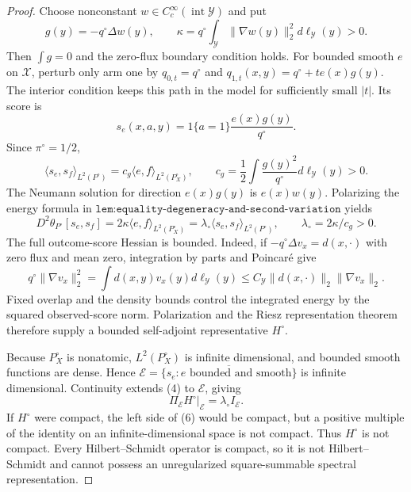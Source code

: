\documentclass{article}
\begin{document}
\begin{proof}
Choose nonconstant \(w\in C_c^\infty(\operatorname{int}\mathcal Y)\) and put
\[g(y)=-q^\circ\Delta w(y),\qquad \kappa=q^\circ\int_{\mathcal Y}\lVert\nabla w(y)\rVert_2^2d\ell_{\mathcal Y}(y)>0.\tag{1}\]
Then \(\int g=0\) and the zero-flux boundary condition holds. For bounded smooth \(e\) on \(\mathcal X\), perturb only arm one by \(q_{0,t}=q^\circ\) and \(q_{1,t}(x,y)=q^\circ+te(x)g(y)\). The interior condition keeps this path in the model for sufficiently small \(|t|\). Its score is
\[s_e(x,a,y)=1\{a=1\}\frac{e(x)g(y)}{q^\circ}.\tag{2}\]
Since \(\pi^\circ=1/2\),
\[\langle s_e,s_f\rangle_{L^2(P^\circ)}=c_g\langle e,f\rangle_{L^2(P_X^\circ)},\qquad c_g=\frac12\int\frac{g(y)^2}{q^\circ}d\ell_{\mathcal Y}(y)>0.\tag{3}\]
The Neumann solution for direction \(e(x)g(y)\) is \(e(x)w(y)\). Polarizing the energy formula in \(\texttt{lem:equality-degeneracy-and-second-variation}\) yields
\[D^2\theta_{P^\circ}[s_e,s_f]=2\kappa\langle e,f\rangle_{L^2(P_X^\circ)}=\lambda_\circ\langle s_e,s_f\rangle_{L^2(P^\circ)},\qquad \lambda_\circ=2\kappa/c_g>0.\tag{4}\]
The full outcome-score Hessian is bounded. Indeed, if \(-q^\circ\Delta v_x=d(x,\cdot)\) with zero flux and mean zero, integration by parts and Poincar\'e give
\[q^\circ\lVert\nabla v_x\rVert_2^2=\int d(x,y)v_x(y)d\ell_{\mathcal Y}(y)\le C_{\mathcal Y}\lVert d(x,\cdot)\rVert_2\lVert\nabla v_x\rVert_2.\tag{5}\]
Fixed overlap and the density bounds control the integrated energy by the squared observed-score norm. Polarization and the Riesz representation theorem therefore supply a bounded self-adjoint representative \(H^\circ\).

Because \(P_X^\circ\) is nonatomic, \(L^2(P_X^\circ)\) is infinite dimensional, and bounded smooth functions are dense. Hence \(\mathcal E=\overline{\{s_e:e\text{ bounded and smooth}\}}\) is infinite dimensional. Continuity extends (4) to \(\mathcal E\), giving
\[\Pi_{\mathcal E}H^\circ|_{\mathcal E}=\lambda_\circ I_{\mathcal E}.\tag{6}\]
If \(H^\circ\) were compact, the left side of (6) would be compact, but a positive multiple of the identity on an infinite-dimensional space is not compact. Thus \(H^\circ\) is not compact. Every Hilbert--Schmidt operator is compact, so it is not Hilbert--Schmidt and cannot possess an unregularized square-summable spectral representation.
\end{proof}
\end{document}
